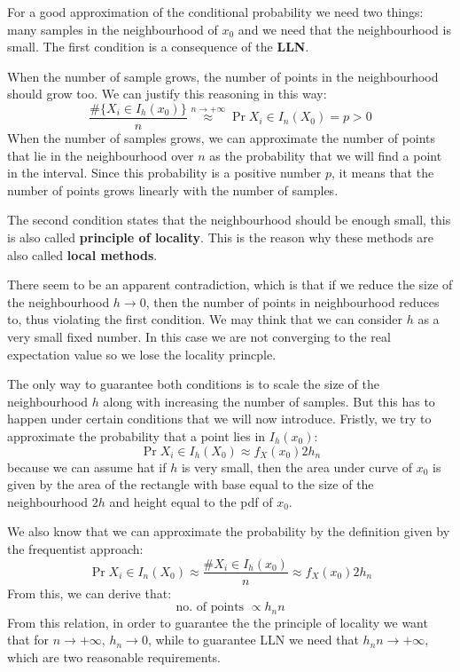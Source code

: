 For a good approximation of the conditional probability we need two things: many samples in the neighbourhood of $x_0$ and we need that the neighbourhood is small. The first condition is a consequence of the \textbf{LLN}.

When the number of sample grows, the number of points in the neighbourhood should grow too. We can justify this reasoning in this way:
\[
    \frac{\#\{X_i \in I_h(x_0)\}}{n} \stackrel{n \to +\infty}{\approx} \Pr{X_i \in I_n(X_0)} = p > 0
\]
When the number of samples grows, we can approximate the number of points that lie in the neighbourhood over $n$ as the probability that we will find a point in the interval. Since this probability is a positive number $p$, it means that the number of points grows linearly with the number of samples.

The second condition states that the neighbourhood should be enough small, this is also called \textbf{principle of locality}. This is the reason why these methods are also called \textbf{local methods}.

There seem to be an apparent contradiction, which is that if we reduce the size of the neighbourhood $h \to 0$, then the number of points in neighbourhood reduces to, thus violating the first condition. We may think that we can consider $h$ as a very small fixed number. In this case we are not converging to the real expectation value so we lose the locality princple.

The only way to guarantee both conditions is to scale the size of the neighbourhood $h$ along with increasing the number of samples. But this has to happen under certain conditions that we will now introduce. Fristly, we try to approximate the probability that a point lies in $I_h(x_0)$:
\[
    \Pr{X_i \in I_h(X_0)} \approx f_X(x_0) 2 h_n
\]
because we can assume hat if $h$ is very small, then the area under curve of $x_0$ is given by the area of the rectangle with base equal to the size of the neighbourhood $2h$ and height equal to the pdf of $x_0$.

We also know that we can approximate the probability by the definition given by the frequentist approach:
\[
    \Pr{X_i \in I_n(X_0)} \approx \frac{\#{X_i \in I_h(x_0)}}{n} \approx f_X(x_0) 2 h_n
\]
From this, we can derive that:
\[
    \text{no. of points } \propto h_n n
\]
From this relation, in order to guarantee the the principle of locality we want that for $n \to +\infty$, $h_n \to 0$, while to guarantee LLN we need that $h_n n \to +\infty$, which are two reasonable requirements.

